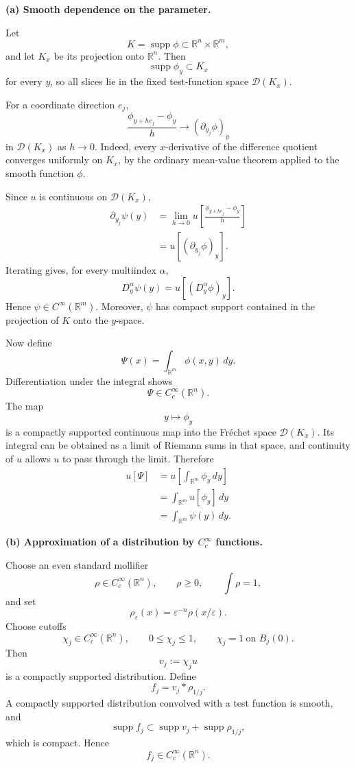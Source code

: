 \begin{solution}

\smallskip
\noindent\textbf{(a) Smooth dependence on the parameter.}

Let
\[
K
=
\operatorname{supp}\phi
\subset
\mathbb R^n\times\mathbb R^m,
\]
and let \(K_x\) be its projection onto \(\mathbb R^n\). Then
\[
\operatorname{supp}\phi_y\subset K_x
\]
for every \(y\), so all slices lie in the fixed test-function space
\(\mathcal D(K_x)\).

For a coordinate direction \(e_j\),
\[
\frac{\phi_{y+he_j}-\phi_y}{h}
\longrightarrow
(\partial_{y_j}\phi)_y
\]
in \(\mathcal D(K_x)\) as \(h\to0\). Indeed, every \(x\)-derivative of
the difference quotient converges uniformly on \(K_x\), by the ordinary
mean-value theorem applied to the smooth function \(\phi\).

Since \(u\) is continuous on \(\mathcal D(K_x)\),
\[
\begin{aligned}
\partial_{y_j}\psi(y)
&=
\lim_{h\to0}
u\!\left[
\frac{\phi_{y+he_j}-\phi_y}{h}
\right]\\
&=
u[(\partial_{y_j}\phi)_y].
\end{aligned}
\]
Iterating gives, for every multiindex \(\alpha\),
\[
\boxed{
D_y^\alpha\psi(y)
=
u[(D_y^\alpha\phi)_y].}
\]
Hence \(\psi\in C^\infty(\mathbb R^m)\). Moreover, \(\psi\) has compact
support contained in the projection of \(K\) onto the \(y\)-space.

Now define
\[
\Psi(x)
=
\int_{\mathbb R^m}\phi(x,y)\,dy.
\]
Differentiation under the integral shows
\[
\Psi\in C_c^\infty(\mathbb R^n).
\]
The map
\[
y\longmapsto\phi_y
\]
is a compactly supported continuous map into the Fréchet space
\(\mathcal D(K_x)\). Its integral can be obtained as a limit of Riemann
sums in that space, and continuity of \(u\) allows \(u\) to pass through
the limit. Therefore
\[
\begin{aligned}
u[\Psi]
&=
u\!\left[
\int_{\mathbb R^m}\phi_y\,dy
\right]\\
&=
\int_{\mathbb R^m}u[\phi_y]\,dy\\
&=
\boxed{
\int_{\mathbb R^m}\psi(y)\,dy.}
\end{aligned}
\]

\smallskip
\noindent\textbf{(b) Approximation of a distribution by \(C_c^\infty\) functions.}

Choose an even standard mollifier
\[
\rho\in C_c^\infty(\mathbb R^n),
\qquad
\rho\ge0,
\qquad
\int\rho=1,
\]
and set
\[
\rho_\varepsilon(x)
=
\varepsilon^{-n}\rho(x/\varepsilon).
\]
Choose cutoffs
\[
\chi_j\in C_c^\infty(\mathbb R^n),
\qquad
0\le\chi_j\le1,
\qquad
\chi_j=1\ \text{on }B_j(0).
\]
Then
\[
v_j:=\chi_j u
\]
is a compactly supported distribution. Define
\[
f_j
=
v_j*\rho_{1/j}.
\]
A compactly supported distribution convolved with a test function is smooth,
and
\[
\operatorname{supp}f_j
\subset
\operatorname{supp}v_j
+
\operatorname{supp}\rho_{1/j},
\]
which is compact. Hence
\[
f_j\in C_c^\infty(\mathbb R^n).
\]


\end{solution}
